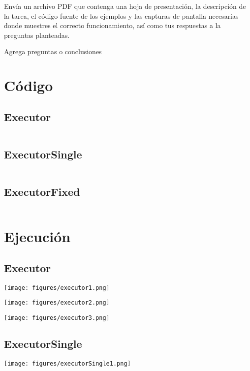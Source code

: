\documentclass[12pt]{article}
\begin{document}
Envía un archivo PDF que contenga una hoja de presentación, la
descripción de la tarea, el código fuente de los ejemplos y las
capturas de pantalla necesarias donde muestres el correcto
funcionamiento, así como tus respuestas a la preguntas planteadas.

Agrega preguntas o conclusiones

\section*{Código}

\subsection*{Executor}
\inputminted{Java}{Executor.java}
\subsection*{ExecutorSingle}
\inputminted{Java}{ExecutorSingle.java}
\subsection*{ExecutorFixed}
\inputminted{Java}{ExecutorFixed.java}

\section*{Ejecución}

\subsection*{Executor}
\begin{center}

  \texttt{[image: figures/executor1.png]}
\end{center}

\begin{center}

  \texttt{[image: figures/executor2.png]}
\end{center}

\begin{center}

  \texttt{[image: figures/executor3.png]}
\end{center}

\subsection*{ExecutorSingle}
\begin{center}

  \texttt{[image: figures/executorSingle1.png]}
\end{center}
\end{document}
